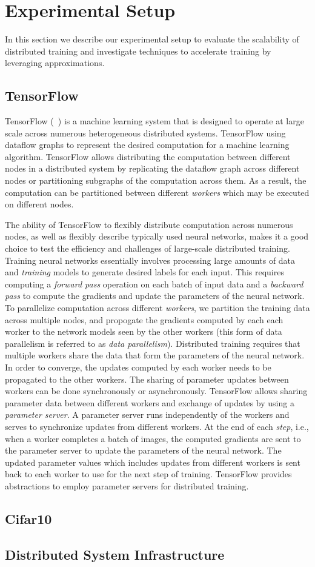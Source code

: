 \section{Experimental Setup}
In this section we describe our experimental setup to evaluate the scalability of distributed training and investigate techniques to accelerate training by leveraging approximations. 
\subsection{TensorFlow}
TensorFlow (~\cite{tensorflow}) is a machine learning system that is designed to operate at large scale across numerous heterogeneous distributed systems. TensorFlow using dataflow graphs to represent the desired computation for a machine learning algorithm. TensorFlow allows distributing the computation between different nodes in a distributed system by replicating the dataflow graph across different nodes or partitioning subgraphs of the computation across them. As a result, the computation can be partitioned between different \emph{workers} which may be executed on different nodes. 

The ability of TensorFlow to flexibly distribute computation across numerous nodes, as well as flexibly describe typically used neural networks, makes it a good choice to test the efficiency and challenges of large-scale distributed training. Training neural networks essentially involves processing large amounts of data and \emph{training} models to generate desired labels for each input. This requires computing a \emph{forward pass} operation on each batch of input data and a \emph{backward pass} to compute the gradients and update the parameters of the neural network. To parallelize computation across different \emph{workers}, we partition the training data across multiple nodes, and propogate the gradients computed by each each worker to the network models seen by the other workers (this form of data parallelism is referred to as \emph{data parallelism}). Distributed training requires that multiple workers share the data that form the parameters of the neural network. In order to converge, the updates computed by each worker needs to be propagated to the other workers. The sharing of parameter updates between workers can be done synchronously or asynchronously. TensorFlow allows sharing parameter data between different workers and exchange of updates by using a \emph{parameter server}\cite{parameter_server}. A parameter server runs independently of the workers and serves to synchronize updates from different workers. At the end of each \emph{step}, i.e., when a worker completes a batch of images, the computed gradients are sent to the parameter server to update the parameters of the neural network. The 
updated parameter values which includes updates from different workers is sent back to each worker to use for the next step of training.
TensorFlow provides abstractions to employ parameter servers for distributed training. 

\subsection{Cifar10}
\subsection{Distributed System Infrastructure}
